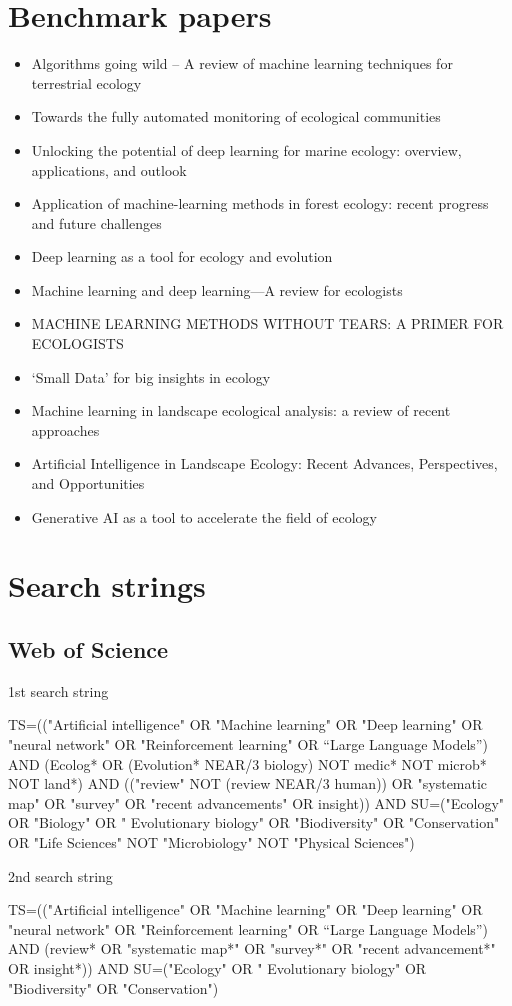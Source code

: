 \documentclass{article}
\newcommand{\bei}{\begin{itemize}}
\newcommand{\eei}{\end{itemize}}
\begin{document}
\section{Benchmark papers}
\bei
\item Algorithms going wild – A review of machine learning techniques for terrestrial ecology
\item Towards the fully automated monitoring of ecological communities
\item Unlocking the potential of deep learning for marine ecology: overview, applications, and outlook
\item Application of machine-learning methods in forest ecology: recent progress and future challenges
\item Deep learning as a tool for ecology and evolution
\item Machine learning and deep learning—A review for ecologists
\item MACHINE LEARNING METHODS WITHOUT TEARS: A PRIMER FOR ECOLOGISTS
\item ‘Small Data’ for big insights in ecology
\item Machine learning in landscape ecological analysis: a review of recent approaches
\item Artificial Intelligence in Landscape Ecology: Recent Advances, Perspectives, and Opportunities
\item Generative AI as a tool to accelerate the field of ecology
\eei

\section{Search strings}
\subsection{Web of Science}
1st search string

TS=(("Artificial intelligence" OR "Machine learning" OR "Deep learning" OR "neural network" OR "Reinforcement learning" OR “Large Language Models”) AND (Ecolog* OR (Evolution* NEAR/3 biology) NOT medic* NOT microb* NOT land*) AND (("review" NOT (review NEAR/3 human)) OR "systematic map" OR "survey" OR "recent advancements" OR insight)) AND SU=("Ecology" OR "Biology" OR " Evolutionary biology" OR "Biodiversity" OR "Conservation" OR "Life Sciences" NOT "Microbiology" NOT "Physical Sciences")


2nd search string

TS=(("Artificial intelligence" OR "Machine learning" OR "Deep learning" OR "neural network" OR "Reinforcement learning" OR “Large Language Models”) AND (review* OR "systematic map*" OR "survey*" OR "recent advancement*" OR insight*)) AND SU=("Ecology" OR " Evolutionary biology" OR "Biodiversity" OR "Conservation")
\end{document}
